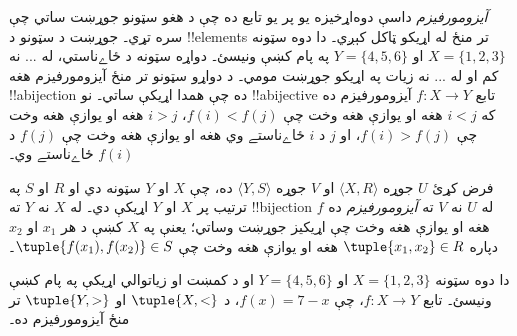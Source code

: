 \documentclass[../../../include/open-logic-section]{subfiles}
\begin{document}

\begin{explain}
\emph{آيزومورفيزم} داسې دوه‌اړخيزه يو پر يو تابع ده چې د هغو سټونو جوړښت ساتي چې سره تړي۔ جوړښت د سټونو د !!{element}s تر منځ له اړيکو ټاکل کېږي۔ دا دوه سټونه $X=\{1,2,3\}$ او $Y=\{4,5,6\}$ په پام کښې ونيسئ۔ دواړه سټونه د ځاے‌ناستي، له ... نه کم او له ... نه زيات په اړيکو جوړښت مومي۔ د دواړو سټونو تر منځ آيزومورفيزم هغه !!a{bijection} ده چې همدا اړيکې ساتي۔ نو !!a{bijective} تابع $f \colon X
\to Y$ آيزومورفيزم ده که $i<j$ هغه او يوازې هغه وخت چې $f(i)<f(j)$، $i>j$ هغه او يوازې هغه وخت چې $f(i)>f(j)$، او $j$ د $i$ ځاے‌ناستے وي هغه او يوازې هغه وخت چې $f(j)$ د $f(i)$ ځاے‌ناستے وي۔
\end{explain}

\begin{defn}[آيزومورفيزم]
فرض کړئ $U$ جوړه $\langle X, R\rangle$ او $V$ جوړه $\langle
Y, S\rangle$ ده، چې $X$ او $Y$ سټونه دي او $R$ او $S$ په ترتيب پر $X$ او $Y$ اړيکې دي۔ له $X$ نه $Y$ ته !!{bijection} $f$ له $U$ نه $V$ ته \emph{آيزومورفيزم} ده هغه او يوازې هغه وخت چې اړيکيز جوړښت وساتي؛ يعنې په $X$ کښې د هر $x_{1}$ او $x_{2}$ دپاره $\tuple{x_1,x_2} \in R$ هغه او يوازې هغه وخت چې $\tuple{f(x_1),f(x_2)} \in S$۔
\end{defn}

\begin{ex}
دا دوه سټونه $X=\{1,2,3\}$ او $Y=\{4,5,6\}$ او د کمښت او زياتوالي اړيکې په پام کښې ونيسئ۔ تابع $f\colon X \to
Y$، چې $f(x) = 7-x$، د $\tuple{X,<}$ او $\tuple{Y,>}$ تر منځ آيزومورفيزم ده۔
\end{ex}
\end{document}
